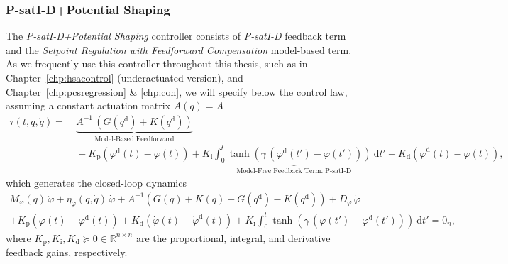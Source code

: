 \subsubsection{P-satI-D+Potential Shaping}
The \emph{P-satI-D+Potential Shaping} controller consists of \emph{P-satI-D} feedback term and the \emph{Setpoint Regulation with Feedforward Compensation} model-based term.
As we frequently use this controller throughout this thesis, such as in Chapter~\ref{chp:hsacontrol} (underactuated version), and Chapter~\ref{chp:pcsregression} \& \ref{chp:con}, we will specify below the control law, assuming a constant actuation matrix $A(q) = A$
\begin{equation}
\begin{split}
    \tau(t,q,\dot{q}) =& \: \underbrace{A^{-1} \, \left ( G(q^\mathrm{d}) + K(q^\mathrm{d}) \right )}_\text{Model-Based Feedforward}\\
    & \: + \underbrace{K_\mathrm{p} \left (\varphi^\mathrm{d}(t) - \varphi(t) \right ) + K_\mathrm{i} \int_0^t \tanh \left ( \gamma \, ( \varphi^\mathrm{d}(t')-\varphi(t') ) \right ) \: \mathrm{d} t' + K_\mathrm{d} \left ( \dot{\varphi}^\mathrm{d}(t) - \dot{\varphi}(t) \right )}_\text{Model-Free Feedback Term: P-satI-D},
\end{split}
\end{equation}
which generates the closed-loop dynamics
\begin{equation}
\begin{split}
    M_\varphi(q) \, \ddot{\varphi} + \eta_\varphi(q,\dot{q}) \, \dot{\varphi} + A^{-1} \left ( G(q) + K(q) - G(q^\mathrm{d}) - K(q^\mathrm{d}) \right ) + D_\varphi \, \dot{\varphi}\\
    + K_\mathrm{p} \left (\varphi(t) - \varphi^\mathrm{d}(t) \right ) + K_\mathrm{d} \left ( \dot{\varphi}(t) - \dot{\varphi}^\mathrm{d}(t) \right ) + K_\mathrm{i} \int_0^t \tanh \left ( \gamma \, ( \varphi(t')-\varphi^\mathrm{d}(t') ) \right ) \: \mathrm{d} t' = 0_n,
\end{split}
\end{equation}
where $K_\mathrm{p}, K_\mathrm{i}, K_\mathrm{d} \succeq 0 \in \mathbb{R}^{n \times n}$ are the proportional, integral, and derivative feedback gains, respectively.


